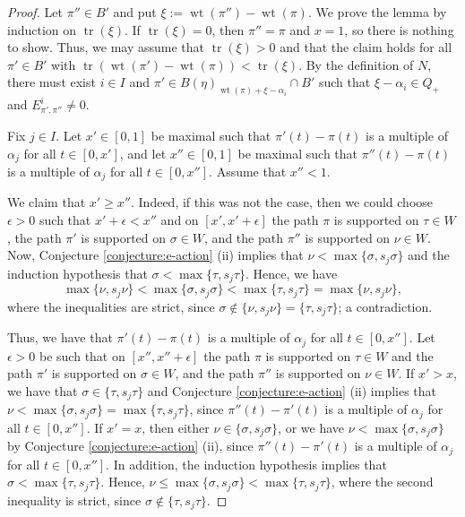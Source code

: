 \documentclass[final]{amsart}
\theoremstyle{plain}
\theoremstyle{definition}
\DeclareMathOperator{\trace}{tr}
\DeclareMathOperator{\weight}{wt}
\begin{document}
\begin{proof}
    Let $\pi'' \in B'$ and put $\xi := \weight(\pi'') - \weight(\pi)$.
    We prove the lemma by induction on $\trace(\xi)$.
    If $\trace(\xi) = 0$, then $\pi'' = \pi$ and $x = 1$, so there is nothing to show.
    Thus, we may assume that $\trace(\xi) > 0$ and that the claim holds for all $\pi' \in B'$ with $\trace(\weight(\pi') - \weight(\pi)) < \trace(\xi)$.
    By the definition of $N$, there must exist $i \in I$ and $\pi' \in B(\eta)_{\weight(\pi)+\xi-\alpha_i} \cap B'$ such that $\xi - \alpha_i \in Q_+$ and $E_{\pi',\pi''}^i \neq 0$.

    Fix $j \in I$.
    Let $x' \in [0, 1]$ be maximal such that $\pi'(t) - \pi(t)$ is a multiple of $\alpha_j$ for all $t \in [0, x']$, and let $x'' \in [0, 1]$ be maximal such that $\pi''(t) - \pi(t)$ is a multiple of $\alpha_j$ for all $t \in [0, x'']$.
    Assume that $x'' < 1$.

    We claim that $x' \ge x''$.
    Indeed, if this was not the case, then we could choose $\epsilon > 0$ such that $x'+\epsilon < x''$ and on $[x', x'+\epsilon]$ the path $\pi$ is supported on $\tau \in W$, the path $\pi'$ is supported on $\sigma \in W$, and the path $\pi''$ is supported on $\nu \in W$.
    Now, Conjecture \ref{conjecture:e-action} (ii) implies that $\nu < \max\{\sigma, s_j\sigma\}$ and the induction hypothesis that $\sigma < \max\{\tau, s_j\tau\}$.
    Hence, we have
    \[
        \max\{\nu, s_j\nu\} < \max\{\sigma, s_j\sigma\} < \max\{\tau, s_j\tau\} = \max\{\nu, s_j\nu\},
    \]
    where the inequalities are strict, since $\sigma \notin \{\nu, s_j\nu\} = \{\tau, s_j\tau\}$; a contradiction.

    Thus, we have that $\pi'(t) - \pi(t)$ is a multiple of $\alpha_j$ for all $t \in [0, x'']$.
    Let $\epsilon > 0$ be such that on $[x'', x''+\epsilon]$ the path $\pi$ is supported on $\tau \in W$ and the path $\pi'$ is supported on $\sigma \in W$, and the path $\pi''$ is supported on $\nu \in W$.
    If $x' > x$, we have that $\sigma \in \{\tau, s_j\tau\}$ and Conjecture \ref{conjecture:e-action} (ii) implies that $\nu < \max\{\sigma, s_j\sigma\} = \max\{\tau, s_j\tau\}$, since $\pi''(t) - \pi'(t)$ is a multiple of $\alpha_j$ for all $t \in [0, x'']$.
    If $x' = x$, then either $\nu \in \{\sigma, s_j\sigma\}$, or we have $\nu < \max\{\sigma, s_j\sigma\}$ by Conjecture \ref{conjecture:e-action} (ii), since $\pi''(t)-\pi'(t)$ is a multiple of $\alpha_j$ for all $t \in [0, x'']$.
    In addition, the induction hypothesis implies that $\sigma < \max\{\tau, s_j\tau\}$.
    Hence, $\nu \le \max\{\sigma, s_j\sigma\} < \max\{\tau, s_j\tau\}$, where the second inequality is strict, since $\sigma \notin \{\tau, s_j\tau\}$.


\end{proof}
\end{document}
